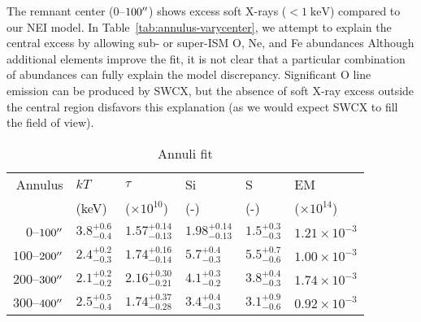 \documentclass[preprint2,tighten,trackchanges]{aastex6}
\newcommand*{\mt}{\mathrm}
\newcommand*{\unit}[1]{\;\mt{#1}}  %
\begin{document}
The remnant center ($0$--$100\mbox{$^{\prime\prime}$}$) shows excess soft X-rays
($<1 \unit{keV}$) compared to our NEI model.
In Table~\ref{tab:annulus-varycenter}, we attempt to explain the central excess
by allowing sub- or super-ISM O, Ne, and Fe abundances
Although additional elements improve the fit, it is not clear that a particular
combination of abundances can fully explain the model discrepancy.
Significant O line emission can be produced by SWCX, but the absence of soft
X-ray excess outside the central region disfavors this explanation (as we would
expect SWCX to fill the field of view).

\begin{table}
    \centering
    \caption{Annuli fit \label{tab:annulus-fit}}
    \begin{tabular}{@{}rlllll@{}}
        \toprule
        Annulus & $kT$ & $\tau$ & Si & S & EM \\
         & (keV) & ($\times 10^{10}$) & (-) & (-) & ($\times 10^{14}$)\\
        \midrule
        $0$--$100\mbox{$^{\prime\prime}$}$ & ${3.8}^{+0.6}_{-0.4}$ & ${1.57}^{+0.14}_{-0.13}$ & ${1.98}^{+0.14}_{-0.13}$ & ${1.5}^{+0.3}_{-0.3}$ & $1.21 \times 10^{-3}$ \\
        $100$--$200\mbox{$^{\prime\prime}$}$ & ${2.4}^{+0.2}_{-0.3}$ & ${1.74}^{+0.16}_{-0.14}$ & ${5.7}^{+0.4}_{-0.3}$ & ${5.5}^{+0.7}_{-0.6}$ & $1.00 \times 10^{-3}$ \\
        $200$--$300\mbox{$^{\prime\prime}$}$ & ${2.1}^{+0.2}_{-0.2}$ & ${2.16}^{+0.30}_{-0.21}$ & ${4.1}^{+0.3}_{-0.2}$ & ${3.8}^{+0.4}_{-0.3}$ & $1.74 \times 10^{-3}$ \\
        $300$--$400\mbox{$^{\prime\prime}$}$ & ${2.5}^{+0.5}_{-0.4}$ & ${1.74}^{+0.37}_{-0.28}$ & ${3.4}^{+0.4}_{-0.3}$ & ${3.1}^{+0.9}_{-0.6}$ & $0.92 \times 10^{-3}$ \\
        \bottomrule
    \end{tabular}
\end{table}

\begin{figure*}[]
    \label{fig:annuli-spectra}
\end{figure*}
\end{document}
